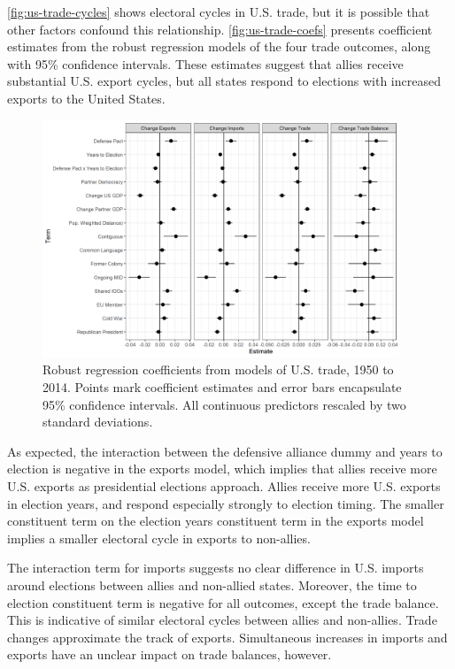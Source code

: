 \documentclass[12pt]{article}
\begin{document}
\autoref{fig:us-trade-cycles} shows electoral cycles in U.S. trade, but it is possible that other factors confound this relationship.
\autoref{fig:us-trade-coefs} presents coefficient estimates from the robust regression models of the four trade outcomes, along with 95\% confidence intervals. 
These estimates suggest that allies receive substantial U.S. export cycles, but all states respond to elections with increased exports to the United States. 


\begin{figure}
\centering
\includegraphics[width=0.95\textwidth]{../figures/us-trade-coefs.png}
\caption{Robust regression coefficients from models of U.S. trade, 1950 to 2014. Points mark coefficient estimates and error bars encapsulate 95\% confidence intervals. All continuous predictors rescaled by two standard deviations.}
\label{fig:us-trade-coefs}
\end{figure}


As expected, the interaction between the defensive alliance dummy and years to election is negative in the exports model, which implies that allies receive more U.S. exports as presidential elections approach.
Allies receive more U.S. exports in election years, and respond especially strongly to election timing.
The smaller constituent term on the election years constituent term in the exports model implies a smaller electoral cycle in exports to non-allies.


The interaction term for imports suggests no clear difference in U.S. imports around elections between allies and non-allied states. 
Moreover, the time to election constituent term is negative for all outcomes, except the trade balance. 
This is indicative of similar electoral cycles between allies and non-allies.
Trade changes approximate the track of exports. 
Simultaneous increases in imports and exports have an unclear impact on trade balances, however. 
 
\end{document}
